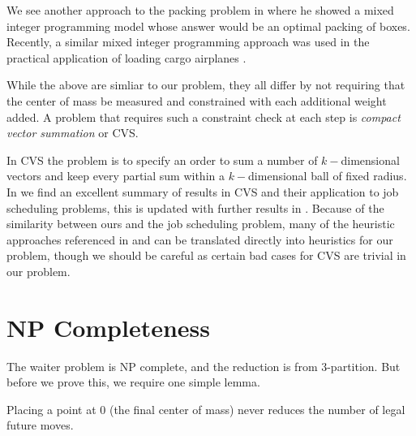 \documentclass[11pt,twocolumn]{article}
\begin{document}
We see another approach to the packing problem in \cite{fasano2004mip} where he showed a mixed integer programming model whose answer would be an optimal packing of boxes.  Recently, a similar mixed integer programming approach was used in the practical application  of loading cargo airplanes \cite{limbourg2012automatic}.  

While the above are simliar to our problem, they all differ by not requiring that the center of mass be measured and constrained with each additional weight added.  A problem that requires such a constraint check at each step is {\it compact vector summation} or CVS. 

In CVS the problem is to specify an order to sum a number of $k-$dimensional vectors and keep every partial sum within a $k-$dimensional ball of fixed radius. In \cite{sevast1994some} we find an excellent summary of results in CVS and their application to job scheduling problems, this is updated with further results in \cite{sevastianov1998nonstrict}.  Because of the similarity between ours and the job scheduling problem, many of the heuristic approaches referenced in \cite{framinan2004review} and \cite{gupta2006performance} can be translated directly into heuristics for our problem, though we should be careful as certain bad cases for CVS \cite{chelidze2010greedy} are trivial in our problem.

\section{NP Completeness}

The waiter problem is NP complete, and the reduction is from 3-partition.  But before we prove this, we require one simple lemma.

\begin{lem} \label{lem:zerosChangeNothing} 
Placing a point at 0 (the final center of mass) never reduces the number of legal future moves.  
\end{lem}
\end{document}

